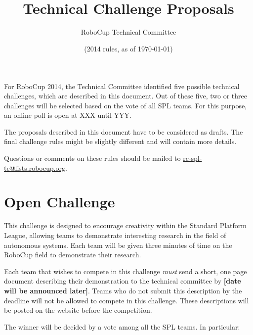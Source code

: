\documentclass[12pt]{article}
\title{\leaguename \\ Technical Challenge Proposals}
\author{RoboCup Technical Committee}
\date{(2014 rules, as of \today)}
\begin{document}
\maketitle

For RoboCup 2014, the Technical Committee identified five possible technical challenges, which are described in this document. Out of these five, two or three challenges will be selected based on the vote of all SPL teams. For this purpose, an online poll is open at  XXX until  YYY.

The proposals described in this document have to be considered as drafts. The final challenge rules might be slightly different and will contain more details.

Questions or comments on these rules should be mailed to {\small \url{rc-spl-tc@lists.robocup.org}}.

\vfill

\renewcommand\contentsname{Challenges}
\tableofcontents
\setcounter{tocdepth}{1}

\thispagestyle{fancy}

\clearpage

\cfoot{\thepage}
\setcounter{page}{1}






\section{Open Challenge}
\newcommand{\openMinNum}{three}

This challenge is designed to encourage creativity within the Standard 
Platform League, allowing teams to demonstrate interesting research in 
the field of autonomous systems. Each team will be given \openMinNum{} 
minutes of time on the RoboCup field to demonstrate their research.

Each team that wishes to compete in this challenge \emph{must} send a 
short, one page document describing their demonstration to the technical 
committee by \textbf{[date will be announced later]}.  Teams who do not submit this description by 
the deadline will not be allowed to compete in this challenge. These 
descriptions will be posted on the website before the competition.

The winner will be decided by a vote among all the SPL teams. In particular:
\end{document}
